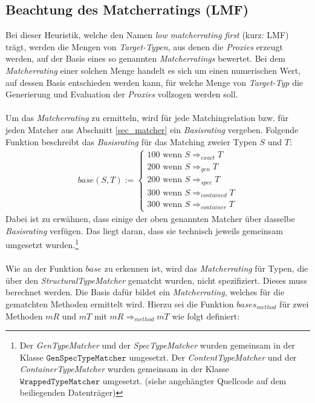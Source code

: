 \subsection{Beachtung des Matcherratings (LMF)}\label{sec_lmf}
Bei dieser \Gls{Heuristik}, welche den Namen \emph{low matcherrating first} (kurz: LMF) trägt, werden die Mengen von \emph{Target-Typen}, aus denen die \emph{Proxies} erzeugt werden, auf der Basis eines so genannten \emph{Matcherratings} bewertet. Bei dem \emph{Matcherrating} einer solchen Menge handelt es sich um einen numerischen Wert, auf dessen Basis entschieden werden kann, für welche Menge von \emph{Target-Typ} die Generierung und Evaluation der \emph{Proxies} vollzogen werden soll.
\\\\
Um das \emph{Matcherrating} zu ermitteln, wird für jede Matchingrelation bzw. für jeden Matcher aus Abschnitt \ref{sec_matcher} ein \emph{Basisrating} vergeben. Folgende Funktion beschreibt das \emph{Basisrating} für das Matching zweier Typen $S$ und $T$:
\begin{gather*}
\mathit{base(S,T)} :=  \left\{ 
				\begin{array}{l}
					100 \text{ wenn } S \Rightarrow_{exact}  T  \\
					200 \text{ wenn } S \Rightarrow_{gen}  T  \\
					200 \text{ wenn } S \Rightarrow_{spec}  T  \\
					300 \text{ wenn } S \Rightarrow_{contained}  T   \\
					300 \text{ wenn } S \Rightarrow_{container}  T  				
				\end{array}             
	\right.
\end{gather*}
\noindent
Dabei ist zu erwähnen, dass einige der oben genannten Matcher über dasselbe \emph{Basisrating} verfügen. Das liegt daran, dass sie technisch jeweils gemeinsam umgesetzt wurden.\footnote{Der \emph{GenTypeMatcher} und der \emph{SpecTypeMatcher} wurden gemeinsam in der Klasse $\texttt{GenSpecTypeMatcher}$ umgesetzt. Der \emph{ContentTypeMatcher} und der \emph{ContainerTypeMatcher} wurden gemeinsam in der Klasse $\texttt{WrappedTypeMatcher}$ umgesetzt. (siehe angehängter Quellcode auf dem beiliegenden Datenträger)}
\\\\
Wie an der Funktion $\mathit{base}$ zu erkennen ist, wird das \emph{Matcherrating} für Typen, die über den \emph{StructuralTypeMatcher} gematcht wurden, nicht spezifiziert. Dieses muss berechnet werden. Die Basis dafür bildet ein \emph{Matcherrating}, welches für die gematchten Methoden ermittelt wird. Hierzu sei die Funktion $\mathit{bases_{method}}$ für zwei Methoden $\mathit{mR}$ und $\mathit{mT}$ mit $\mathit{mR} \Rightarrow_{method} \mathit{mT}$ wie folgt definiert:

